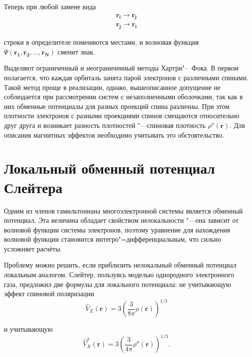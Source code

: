 Теперь при любой замене вида
\begin{equation}
  \begin{split}
    \mathbf{r_i} \rightarrow \mathbf{r_j}\\
    \mathbf{r_j} \rightarrow \mathbf{r_i}
  \end{split}
\end{equation}

строки в определителе поменяются местами, и волновая функция
$\Psi(\mathbf{r_1}, \mathbf{r_2}, \dots, \mathbf{r_N})$ сменит знак.

Выделяют ограниченный и неограниченный методы Хартри"--~Фока. В первом полагается, что
каждая орбиталь занята парой электронов с различными спинами. Такой метод проще в
реализации, однако, вышеописанное допущение не соблюдается при рассмотрении систем с
незаполненными оболочками, так как в них обменные потенциалы для разных проекций спина различны.
При этом плотности электронов с разными проекциями спинов смещаются относительно друг друга и возникает разность
плотностей "---спиновая плотность $\rho^{\sigma}(\mathbf{r})$. Для описания магнитных эффектов необходимо учитывать это
обстоятельство\cite{Pople}.

\section{\textbf{Локальный обменный потенциал Слейтера}}
Одним из членов гамильтониана многоэлектронной системы является
обменный потенциал. Эта величина обладает свойством нелокальности
"---она зависит от волновой функции системы электронов, поэтому уравнение
для нахождения волновой функции становится интегро"=дифференциальным, что сильно усложняет
расчёты.

Проблему можно решить, если приблизить нелокальный обменный потенциал локальным аналогом.
Слейтер, пользуясь моделью однородного электронного газа, предложил две формулы для локального потенциала:
не учитывающую эффект спиновой поляризации
\begin{equation}\label{eq:SlaterExchange}
  \widehat{V}_X(\mathbf{r}) = 3 \left(
    \frac{ 3 }{ 8 \pi }
    \rho(\mathbf{r})
  \right)^{1/3}
\end{equation}

и учитывающую
\begin{equation}
  \widehat{V}_X^{\sigma}(\mathbf{r}) = 3 \left(
    \frac{ 3 }{ 4 \pi }
    \rho^{\sigma}(\mathbf{r})
  \right)^{1/3}.
\end{equation}

